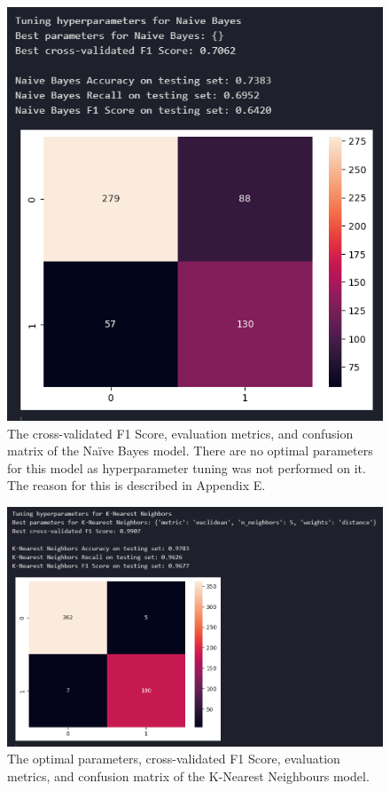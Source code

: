 \documentclass[12pt]{report}
\begin{document}
\begin{figure}[H]
    \centering
    \includegraphics[width=\linewidth]{ModelDev/Iteration2/Results/NB.png}
    \caption{The cross-validated F1 Score, evaluation metrics, and confusion matrix of the Na\"ive Bayes model. There are no optimal 
    parameters for this model as hyperparameter tuning was not performed on it. The reason for this is described in Appendix E.}
    \label{fig:NBIteration2}
\end{figure}

\begin{figure}[H]
    \centering
    \includegraphics[width=\linewidth]{ModelDev/Iteration2/Results/KNN.png}
    \caption{The optimal parameters, cross-validated F1 Score, evaluation metrics, and confusion matrix of the K-Nearest Neighbours model.}
    \label{fig:KNNIteration2}
\end{figure}
\end{document}
